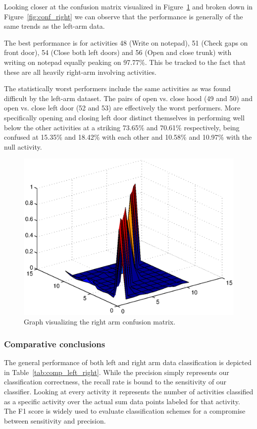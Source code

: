 \documentclass{sig-alternate}
\begin{document}
Looking closer at the confusion matrix visualized in Figure~\ref{fig:conf_right_surf} and broken down in Figure~\ref{fig:conf_right} we can observe that the performance is generally of the same trends as the left-arm data. 

The best performance is for activities 48 (Write on notepad), 51 (Check gaps on front door), 54 (Close both left doors) and 56 (Open and close trunk) with writing on notepad equally peaking on 97.77\%. This be tracked to the fact that these are all heavily right-arm involving activities.

The statistically worst performers include the same activities as was found difficult by the left-arm dataset. The pairs of open vs. close hood (49 and 50) and open vs. close left door (52 and 53) are effectively the worst performers. More specifically opening and closing left door distinct themselves in performing well below the other activities at a striking 73.65\% and 70.61\% respectively, being confused at 15.35\% and 18.42\% with each other and 10.58\% and 10.97\% with the null activity.

\begin{figure}
  \centering
  \includegraphics[scale=0.4]{./matlab_output/nConfkNN_right.eps}
  \caption{Graph visualizing the right arm confusion matrix.}
  \label{fig:conf_right_surf}
\end{figure}

\subsubsection{Comparative conclusions}
The general performance of both left and right arm data classification is depicted in Table~\ref{tab:comp_left_right}. While the precision simply represents our classification correctness, the recall rate is bound to the sensitivity of our classifier. Looking at every activity it represents the number of activities classified as a specific activity over the actual sum data points labeled for that activity. The F1 score is widely used to evaluate classification schemes for a compromise between sensitivity and precision.
\end{document}
